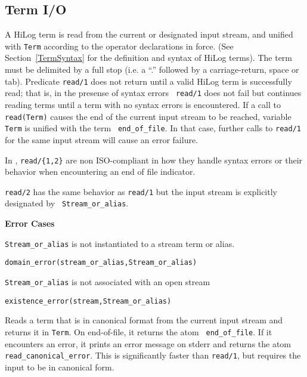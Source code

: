 \subsection{Term I/O}
\begin{description}
    A HiLog term is read from the current or designated input stream,
    and unified with {\tt Term} according to the operator declarations
    in force.  (See Section~\ref{TermSyntax} for the definition and
    syntax of HiLog terms). The term must be delimited by a full stop
    (i.e. a ``.'' followed by a carriage-return, space or tab).
    Predicate {\tt read/1} does not return until a valid HiLog term is
    successfully read; that is, in the presense of syntax errors {\tt
    read/1} does not fail but continues reading terms until a term
    with no syntax errors is encountered.  If a call to {\tt
    read(Term)} causes the end of the current input stream to be
    reached, variable {\tt Term} is unified with the term {\tt
    end\_of\_file}.  In that case, further calls to {\tt read/1} for
    the same input stream will cause an error failure.

%
In \version, {\tt read/\{1,2\}} are non ISO-compliant in how they
handle syntax errors or their behavior when encountering an end of
file indicator.


	{\tt read/2} has the same behavior as {\tt read/1} but the
	input stream is explicitly designated by {\tt
	Stream\_or\_alias}.

{\bf Error Cases}
\bi
\item 	{\tt Stream\_or\_alias} is not instantiated to a stream term or alias.
\bi
\item 	{\tt domain\_error(stream\_or\_alias,Stream\_or\_alias)}
\ei
\item 	{\tt Stream\_or\_alias} is not associated with an open stream
\bi
\item 	{\tt existence\_error(stream,Stream\_or\_alias)}
\ei
\ei

Reads a term that is in canonical format from the current input stream
and returns it in {\tt Term}. On end-of-file, it returns the atom {\tt
end\_of\_file}.  If it encounters an error, it prints an error message
on stderr and returns the atom {\tt read\_canonical\_error}. This is
significantly faster than {\tt read/1}, but requires the input to be
in canonical form.


\end{description}
